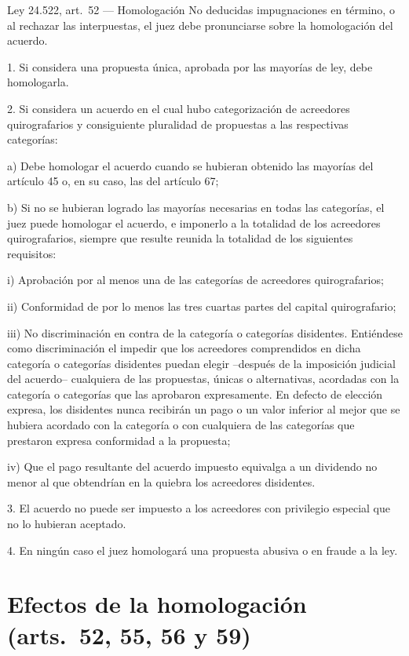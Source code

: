 \documentclass[12pt,oneside]{book}
\begin{document}
\begin{norma}{Ley 24.522, art.\ 52 --- Homologación}
No deducidas impugnaciones en término, o al rechazar las interpuestas, el juez debe pronunciarse sobre la homologación del acuerdo.

1. Si considera una propuesta única, aprobada por las mayorías de ley, debe homologarla.

2. Si considera un acuerdo en el cual hubo categorización de acreedores quirografarios y consiguiente pluralidad de propuestas a las respectivas categorías:

a) Debe homologar el acuerdo cuando se hubieran obtenido las mayorías del artículo 45 o, en su caso, las del artículo 67;

b) Si no se hubieran logrado las mayorías necesarias en todas las categorías, el juez puede homologar el acuerdo, e imponerlo a la totalidad de los acreedores quirografarios, siempre que resulte reunida la totalidad de los siguientes requisitos:

i) Aprobación por al menos una de las categorías de acreedores quirografarios;

ii) Conformidad de por lo menos las tres cuartas partes del capital quirografario;

iii) No discriminación en contra de la categoría o categorías disidentes. Entiéndese como discriminación el impedir que los acreedores comprendidos en dicha categoría o categorías disidentes puedan elegir --después de la imposición judicial del acuerdo-- cualquiera de las propuestas, únicas o alternativas, acordadas con la categoría o categorías que las aprobaron expresamente. En defecto de elección expresa, los disidentes nunca recibirán un pago o un valor inferior al mejor que se hubiera acordado con la categoría o con cualquiera de las categorías que prestaron expresa conformidad a la propuesta;

iv) Que el pago resultante del acuerdo impuesto equivalga a un dividendo no menor al que obtendrían en la quiebra los acreedores disidentes.

3. El acuerdo no puede ser impuesto a los acreedores con privilegio especial que no lo hubieran aceptado.

4. En ningún caso el juez homologará una propuesta abusiva o en fraude a la ley.
\end{norma}

\section{Efectos de la homologación (arts.\ 52, 55, 56 y 59)}
\end{document}
